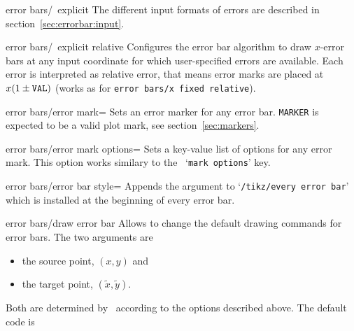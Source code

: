 {\begin{pgfplotsxykey}{error bars/\x\ explicit}
The different input formats of errors are described in section~\ref{sec:errorbar:input}.
\end{pgfplotsxykey}

\begin{pgfplotsxykey}{error bars/\x\ explicit relative}
Configures the error bar algorithm to draw $x$-error bars at any input coordinate for which user-specified errors are available.
 Each error is interpreted as relative error, that means error marks are placed at $x (1 \pm \text{\texttt{VAL}})$ (works as for \texttt{error bars/x fixed relative}).
\end{pgfplotsxykey}


\begin{pgfplotskey}{error bars/error mark=}
Sets an error marker for any error bar. \texttt{MARKER} is expected to be a valid plot mark, see section~\ref{sec:markers}.
\end{pgfplotskey}

\begin{pgfplotskey}{error bars/error mark options=}
Sets a key-value list of options for any error mark. This option works similary to the \Tikz\ `\texttt{mark options}' key.
\end{pgfplotskey}

\begin{pgfplotskey}{error bars/error bar style=}
Appends the argument to `\texttt{/tikz/every error bar}' which is installed at the beginning of every error bar.
\end{pgfplotskey}

\begin{pgfplotscodetwokey}{error bars/draw error bar}
Allows to change the default drawing commands for error bars. The two arguments are
\begin{itemize} 
\item the source point, $(x,y)$ and
\item the target point, $(\tilde x,\tilde y)$.
\end{itemize}
Both are determined by \PGFPlots\ according to the options described above. The default code is
\end{pgfplotscodetwokey}

}
